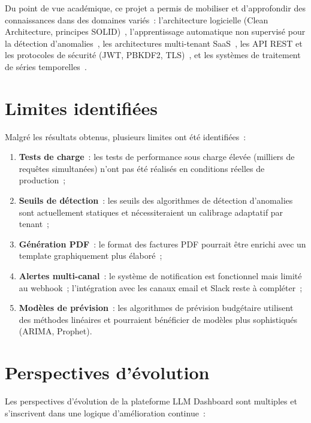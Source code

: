 Du point de vue académique, ce projet a permis de mobiliser et d'approfondir des connaissances dans des domaines variés~: l'architecture logicielle (Clean Architecture, principes SOLID)~\cite{martin2018}, l'apprentissage automatique non supervisé pour la détection d'anomalies~\cite{chandola2009}, les architectures multi-tenant SaaS~\cite{bezemer2010}, les API REST et les protocoles de sécurité (JWT, PBKDF2, TLS)~\cite{rfc7519,owasp2021}, et les systèmes de traitement de séries temporelles~\cite{hyndman2018}.


\section*{Limites identifiées}

Malgré les résultats obtenus, plusieurs limites ont été identifiées~:

\begin{enumerate}[noitemsep]
    \item \textbf{Tests de charge}~: les tests de performance sous charge élevée (milliers de requêtes simultanées) n'ont pas été réalisés en conditions réelles de production~;
    \item \textbf{Seuils de détection}~: les seuils des algorithmes de détection d'anomalies sont actuellement statiques et nécessiteraient un calibrage adaptatif par tenant~;
    \item \textbf{Génération PDF}~: le format des factures PDF pourrait être enrichi avec un template graphiquement plus élaboré~;
    \item \textbf{Alertes multi-canal}~: le système de notification est fonctionnel mais limité au webhook~; l'intégration avec les canaux email et Slack reste à compléter~;
    \item \textbf{Modèles de prévision}~: les algorithmes de prévision budgétaire utilisent des méthodes linéaires et pourraient bénéficier de modèles plus sophistiqués (ARIMA, Prophet).
\end{enumerate}


\section*{Perspectives d'évolution}

Les perspectives d'évolution de la plateforme LLM Dashboard sont multiples et s'inscrivent dans une logique d'amélioration continue~:

